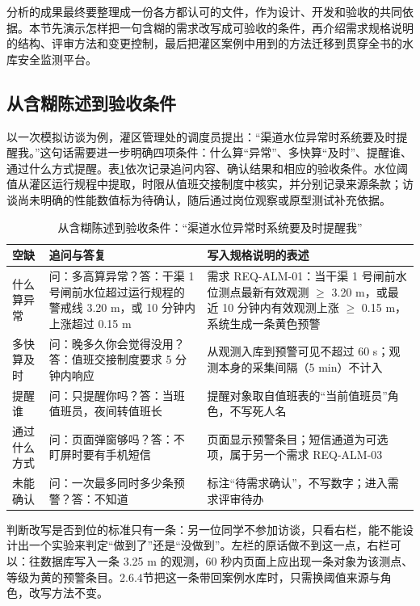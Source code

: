 分析的成果最终要整理成一份各方都认可的文件，作为设计、开发和验收的共同依据。本节先演示怎样把一句含糊的需求改写成可验收的条件，再介绍需求规格说明的结构、评审方法和变更控制，最后把灌区案例中用到的方法迁移到贯穿全书的水库安全监测平台。

\subsection{从含糊陈述到验收条件}

以一次模拟访谈为例，灌区管理处的调度员提出：“渠道水位异常时系统要及时提醒我。”这句话需要进一步明确四项条件：什么算“异常”、多快算“及时”、提醒谁、通过什么方式提醒。表\ref{tab:ch02-vague-to-acceptance}依次记录追问内容、确认结果和相应的验收条件。水位阈值从灌区运行规程中提取，时限从值班交接制度中核实，并分别记录来源条款；访谈尚未明确的性能数值标为待确认，随后通过岗位观察或原型测试补充依据。

\begin{table}[htbp]
\centering
\caption{从含糊陈述到验收条件：“渠道水位异常时系统要及时提醒我”}
\label{tab:ch02-vague-to-acceptance}
\begin{tabular}{p{2.0cm}p{4.6cm}p{6.6cm}}
\toprule
空缺 & 追问与答复 & 写入规格说明的表述 \\
\midrule
什么算异常 & 问：多高算异常？答：干渠 1 号闸前水位超过运行规程的警戒线 3.20 m，或 10 分钟内上涨超过 0.15 m & 需求 REQ-ALM-01：当干渠 1 号闸前水位测点最新有效观测 $\geq$ 3.20 m，或最近 10 分钟内有效观测上涨 $\geq$ 0.15 m，系统生成一条黄色预警 \\
多快算及时 & 问：晚多久你会觉得没用？答：值班交接制度要求 5 分钟内响应 & 从观测入库到预警可见不超过 60 s；观测本身的采集间隔（5 min）不计入 \\
提醒谁 & 问：只提醒你吗？答：当班值班员，夜间转值班长 & 提醒对象取自值班表的“当前值班员”角色，不写死人名 \\
通过什么方式 & 问：页面弹窗够吗？答：不盯屏时要有手机短信 & 页面显示预警条目；短信通道为可选项，属于另一个需求 REQ-ALM-03 \\
未能确认 & 问：一次最多同时多少条预警？答：不知道 & 标注“待需求确认”，不写数字；进入需求评审待办 \\
\bottomrule
\end{tabular}
\end{table}

判断改写是否到位的标准只有一条：另一位同学不参加访谈，只看右栏，能不能设计出一个实验来判定“做到了”还是“没做到”。左栏的原话做不到这一点，右栏可以：往数据库写入一条 3.25 m 的观测，60 秒内页面上应出现一条对象为该测点、等级为黄的预警条目。2.6.4节把这一条带回案例水库时，只需换阈值来源与角色，改写方法不变。

